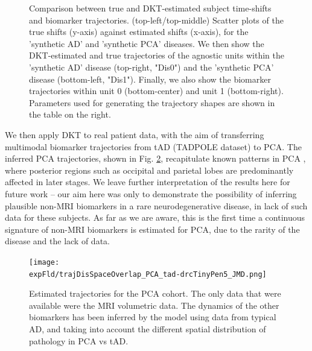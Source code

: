 \documentclass{llncs}
\begin{document}
\begin{figure}[htp]
\begin{flushright}
\begin{tabular}{c}
\end{tabular}
\end{flushright}
\vspace{-1em}
\caption[DKT Simulation Results - Comparison between true and DKT-estimated biomarker trajectories and subject time-shifts.]{Comparison between true and DKT-estimated subject time-shifts and biomarker trajectories. (top-left/top-middle) Scatter plots of the true shifts (y-axis) against estimated shifts (x-axis), for the 'synthetic AD' and 'synthetic PCA' diseases. We then show the DKT-estimated and true trajectories of the agnostic units within the 'synthetic AD' disease (top-right, "Dis0") and the 'synthetic PCA' disease (bottom-left, "Dis1"). Finally, we also show the biomarker trajectories within unit 0 (bottom-center) and unit 1 (bottom-right). Parameters used for generating the trajectory shapes are shown in the table on the right.}
  \label{fig:dktSynthTrajCompTrue}
\end{figure}

We then apply DKT to real patient data, with the aim of transferring multimodal biomarker trajectories from tAD (TADPOLE dataset) to PCA. The inferred PCA trajectories, shown in Fig. \ref{fig:PCAtrajByModality}, recapitulate known patterns in PCA \cite{crutch2012posterior}, where posterior regions such as occipital and parietal lobes are predominantly affected in later stages. We leave further interpretation of the results here for future work -- our aim here was only to demonstrate the possibility of inferring plausible non-MRI biomarkers in a rare neurodegenerative disease, in lack of such data for these subjects. As far as we are aware, this is the first time a continuous signature of non-MRI biomarkers is estimated for PCA, due to the rarity of the disease and the lack of data. 


\begin{figure}[htp]
\centering
 \texttt{[image: \\expFld/trajDisSpaceOverlap\_PCA\_tad-drcTinyPen5\_JMD.png]}
 \caption{Estimated trajectories for the PCA cohort. The only data that were available were the MRI volumetric data. The dynamics of the other biomarkers has been inferred by the model using data from typical AD, and taking into account the different spatial distribution of pathology in PCA vs tAD. }
 \label{fig:PCAtrajByModality}
\end{figure}
\end{document}
